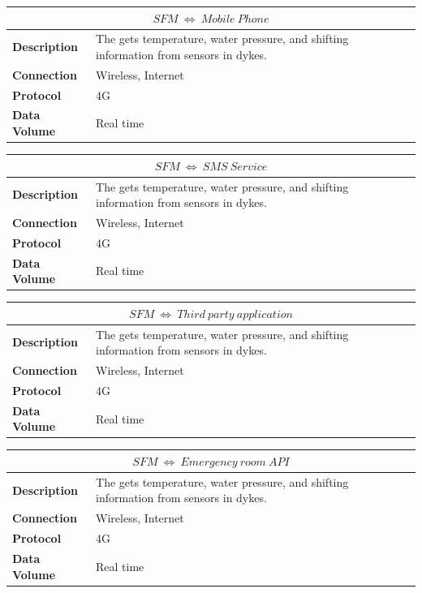 \begin{table}[!htbp]
	\centering
    \begin{tabular}{L{} L{}}
    \toprule
     \\ \midrule
    \textbf{Description} & The \ProjectName{} gets temperature, water pressure, and shifting information from sensors in dykes. \\
    \textbf{Connection} & Wireless, Internet \\
    \textbf{Protocol} & 4G \\
    \textbf{Data Volume} & Real time \\
    \bottomrule
    \end{tabular}
\end{table}
\begin{table}[!htbp]
	\centering
    \begin{tabular}{L{} L{}}
    \toprule
     \\ \midrule
    \textbf{Description} & The \ProjectName{} gets temperature, water pressure, and shifting information from sensors in dykes. \\
    \textbf{Connection} & Wireless, Internet \\
    \textbf{Protocol} & 4G \\
    \textbf{Data Volume} & Real time \\
    \bottomrule
    \end{tabular}
\end{table}
\begin{table}[!htbp]
	\centering
    \begin{tabular}{L{} L{}}
    \toprule
     \\ \midrule
    \textbf{Description} & The \ProjectName{} gets temperature, water pressure, and shifting information from sensors in dykes. \\
    \textbf{Connection} & Wireless, Internet \\
    \textbf{Protocol} & 4G \\
    \textbf{Data Volume} & Real time \\
    \bottomrule
    \end{tabular}
\end{table}
\begin{table}[!htbp]
	\centering
    \begin{tabular}{L{} L{}}
    \toprule
     \\ \midrule
    \textbf{Description} & The \ProjectName{} gets temperature, water pressure, and shifting information from sensors in dykes. \\
    \textbf{Connection} & Wireless, Internet \\
    \textbf{Protocol} & 4G \\
    \textbf{Data Volume} & Real time \\
    \bottomrule
    \end{tabular}
\end{table}


